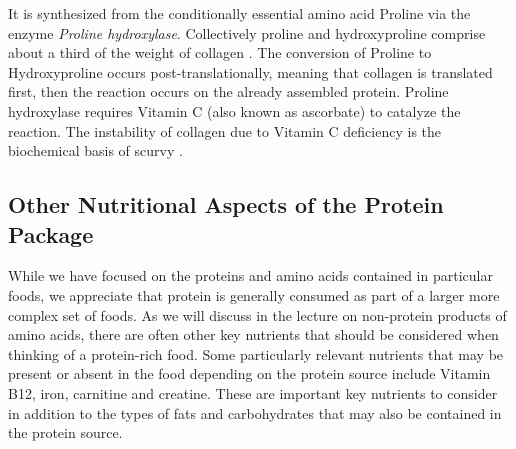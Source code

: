 \documentclass{tufte-handout}
\begin{document}
  It is synthesized from the conditionally essential amino acid Proline via the enzyme \emph{Proline hydroxylase}.  Collectively proline and hydroxyproline comprise about a third of the weight of collagen \citep{Bowes1948}.  The conversion of Proline to Hydroxyproline occurs post-translationally, meaning that collagen is translated first, then the reaction occurs on the already assembled protein.  Proline hydroxylase requires Vitamin C (also known as ascorbate) to catalyze the reaction.  The instability of collagen due to Vitamin C deficiency is the biochemical basis of scurvy \cite{Lind1753}. 

\subsection{Other Nutritional Aspects of the Protein Package}

While we have focused on the proteins and amino acids contained in particular foods, we appreciate that protein is generally consumed as part of a larger more complex set of foods.  As we will discuss in the lecture on non-protein products of amino acids, there are often other key nutrients that should be considered when thinking of a protein-rich food.  Some particularly relevant nutrients that may be present or absent in the food depending on the protein source include Vitamin B12, iron, carnitine and creatine.  These are important key nutrients to consider in addition to the types of fats and carbohydrates that may also be contained in the protein source. 



\end{document}
